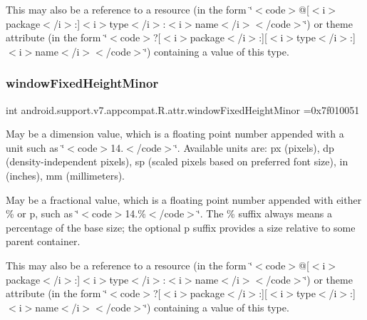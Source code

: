 This may also be a reference to a resource (in the form \char`\"{}$<$code$>$@\mbox{[}$<$i$>$package$<$/i$>$\+:\mbox{]}$<$i$>$type$<$/i$>$\+:$<$i$>$name$<$/i$>$$<$/code$>$\char`\"{}) or theme attribute (in the form \char`\"{}$<$code$>$?\mbox{[}$<$i$>$package$<$/i$>$\+:\mbox{]}\mbox{[}$<$i$>$type$<$/i$>$\+:\mbox{]}$<$i$>$name$<$/i$>$$<$/code$>$\char`\"{}) containing a value of this type. \mbox{\label{classandroid_1_1support_1_1v7_1_1appcompat_1_1R_1_1attr_a878de167a65f79db62c6640c6e39022d}} 
\subsubsection{\texorpdfstring{window\+Fixed\+Height\+Minor}{windowFixedHeightMinor}}
{\footnotesize\ttfamily int android.\+support.\+v7.\+appcompat.\+R.\+attr.\+window\+Fixed\+Height\+Minor =0x7f010051\hspace{0.3cm}{\ttfamily [static]}}

May be a dimension value, which is a floating point number appended with a unit such as \char`\"{}$<$code$>$14.\+5sp$<$/code$>$\char`\"{}. Available units are\+: px (pixels), dp (density-\/independent pixels), sp (scaled pixels based on preferred font size), in (inches), mm (millimeters). 

May be a fractional value, which is a floating point number appended with either \% or p, such as \char`\"{}$<$code$>$14.\%$<$/code$>$\char`\"{}. The \% suffix always means a percentage of the base size; the optional p suffix provides a size relative to some parent container. 

This may also be a reference to a resource (in the form \char`\"{}$<$code$>$@\mbox{[}$<$i$>$package$<$/i$>$\+:\mbox{]}$<$i$>$type$<$/i$>$\+:$<$i$>$name$<$/i$>$$<$/code$>$\char`\"{}) or theme attribute (in the form \char`\"{}$<$code$>$?\mbox{[}$<$i$>$package$<$/i$>$\+:\mbox{]}\mbox{[}$<$i$>$type$<$/i$>$\+:\mbox{]}$<$i$>$name$<$/i$>$$<$/code$>$\char`\"{}) containing a value of this type. \mbox{\label{classandroid_1_1support_1_1v7_1_1appcompat_1_1R_1_1attr_ae79b85d9c96e6c1271593d8f7bb17458}} 
